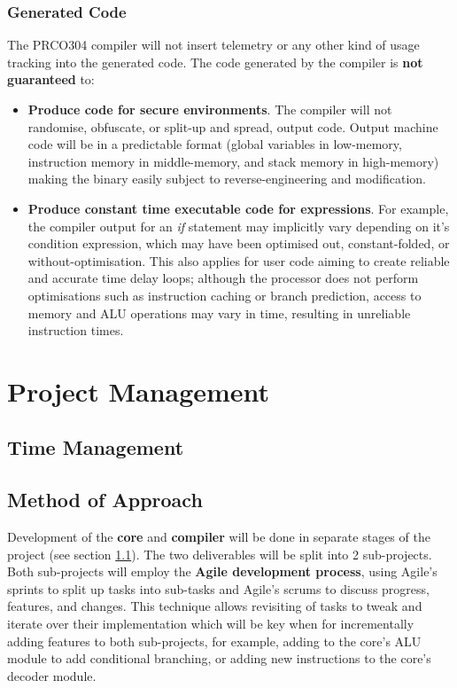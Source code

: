 \documentclass[11pt,a4paper]{report}
\newcommand{\scname}{PRCO304}
\begin{document}
\subsection{Generated Code}
The \scname{} compiler will not insert telemetry or any other kind of usage tracking into the generated code.
The code generated by the compiler is \textbf{not guaranteed} to:
\begin{itemize}
\item{\textbf{Produce code for secure environments}. The compiler will not randomise, obfuscate, or split-up and spread, output code. Output machine code will be in a predictable format (global variables in low-memory, instruction memory in middle-memory, and stack memory in high-memory) making the binary easily subject to reverse-engineering and modification.}
\item{\textbf{Produce constant time executable code for expressions}. For example, the compiler output for an \textit{if} statement may implicitly vary depending on it's condition expression, which may have been optimised out, constant-folded, or without-optimisation. This also applies for user code aiming to create reliable and accurate time delay loops; although the processor does not perform optimisations such as instruction caching or branch prediction, access to memory and ALU operations may vary in time, resulting in unreliable instruction times.}
\end{itemize}



\chapter{Project Management}
{\hypersetup{linkcolor=black}
\startcontents[chapters]
}

\section{Time Management}
\label{sect:proj_time}

\section{Method of Approach}
Development of the \textbf{core} and \textbf{compiler} will be done in separate stages of the project (see section \ref{sect:proj_time}). The two deliverables will be split into 2 sub-projects. Both sub-projects will employ the \textbf{Agile development process}, using Agile's sprints to split up tasks into sub-tasks and Agile's scrums to discuss progress, features, and changes. This technique allows revisiting of tasks to tweak and iterate over their implementation which will be key when for incrementally adding features to both sub-projects, for example, adding to the core's ALU module to add conditional branching, or adding new instructions to the core's decoder module.
\end{document}
